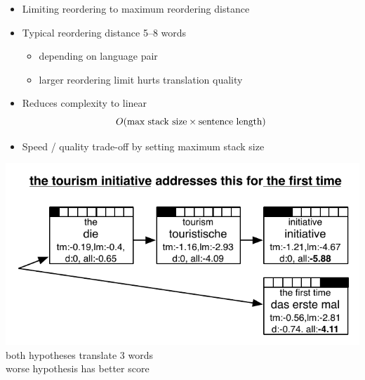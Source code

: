 \documentclass[landscape]{slides}
\newcommand{\maths}[1]{\textcolor{purple}{#1}}
\begin{document}
\begin{itemize}
\item Limiting reordering to maximum reordering distance
\item Typical reordering distance 5--8 words
\begin{itemize}
\item depending on language pair
\item larger reordering limit hurts translation quality
\end{itemize}
\item Reduces complexity to linear
\maths{\begin{equation*}
O(\text{max stack size} \times \text{sentence length})\vspace{-15mm}
\end{equation*}}
\item Speed / quality trade-off by setting maximum stack size
\end{itemize}


\begin{center} \vspace{10mm}
\includegraphics[scale=1.5]{hyp-cost-comparison.pdf}\\[10mm]
both hypotheses translate 3 words\\
worse hypothesis has better score
\end{center}

\end{document}
